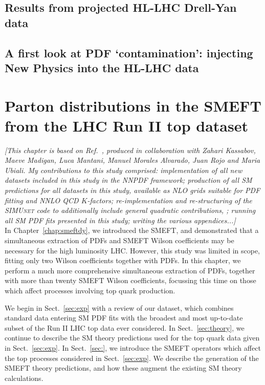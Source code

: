 \documentclass[withindex,glossary]{cam-thesis}
\begin{document}
\newpage
\section{Results from projected HL-LHC Drell-Yan data}
\label{sec:hllhc}

\newpage
\section{A first look at PDF `contamination': injecting New Physics into the HL-LHC data}
\label{sec:hllhc_extension}




\newpage
\chapter{Parton distributions in the SMEFT from the LHC Run II top dataset}
\label{chap:top}

\noindent \textit{[This chapter is based on Ref.~\cite{Kassabov:2023hbm}, produced in collaboration with Zahari Kassabov, Maeve Madigan, Luca Mantani, Manuel Morales Alvarado, Juan Rojo and Maria Ubiali. My contributions to this study comprised: implementation of all new datasets included in this study in the NNPDF framework; production of all SM predictions for all datasets in this study, available as NLO grids suitable for PDF fitting and NNLO QCD $K$-factors; re-implementation and re-structuring of the \textsc{SIMUnet} code to additionally include general quadratic contributions, ; running all SM PDF fits presented in this study; writing the various appendices...]}\\

\noindent In Chapter~\ref{chap:smeftdy}, we introduced the SMEFT, and demonstrated that a simultaneous extraction of PDFs and SMEFT Wilson coefficients may be necessary for the high luminosity LHC. However, this study was limited in scope, fitting only two Wilson coefficients together with PDFs. In this chapter, we perform a much more comprehensive simultaneous extraction of PDFs, together with more than twenty SMEFT Wilson coefficients, focussing this time on those which affect processes involving top quark production.

We begin in Sect.~\ref{sec:exp} with a review of our dataset, which combines standard data entering SM PDF fits with the broadest and most up-to-date subset of the Run II LHC top data ever considered. In Sect.~\ref{sec:theory}, we continue to describe the SM theory predictions used for the top quark data given in Sect.~\ref{sec:exp}. In Sect.~\ref{sec:}, we introduce the SMEFT operators which affect the top processes considered in Sect.~\ref{sec:exp}. We describe the generation of the SMEFT theory predictions, and how these augment the existing SM theory calculations.
\end{document}
